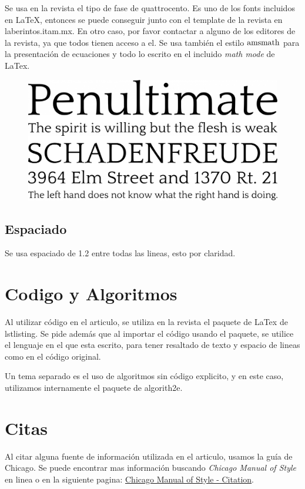 \documentclass{article}
\begin{document}
Se usa en la revista el tipo de fase de quattrocento. Es uno de los fonts incluidos en LaTeX, entonces se puede conseguir junto con el template de la revista en laberintos.itam.mx. En otro caso, por favor contactar a alguno de los editores de la revista, ya que todos tienen acceso a el. Se usa también el estilo $\textnormal{amsmath}$ para la presentación de ecuaciones y todo lo escrito en el incluido \textit{math mode} de LaTex. 

\begin{figure}[ht]
\includegraphics[width=12cm]{font.png}
\centering
\end{figure}

\subsection{Espaciado}
Se usa espaciado de 1.2 entre todas las lineas, esto por claridad. 

\section{Codigo y Algoritmos} 
Al utilizar código en el articulo, se utiliza en la revista el paquete de LaTex de lstlisting. Se pide además que al importar el código usando el paquete, se utilice el lenguaje en el que esta escrito, para tener resaltado de texto y espacio de lineas como en el código original. 

Un tema separado es el uso de algoritmos sin código explicito, y en este caso, utilizamos internamente el paquete de algorith2e.

\section{Citas}
Al citar alguna fuente de información utilizada en el articulo, usamos la guía de Chicago. Se puede encontrar mas información buscando \textit{Chicago Manual of Style} en linea o en la siguiente pagina: \href{http://www.chicagomanualofstyle.org/tools_citationguide/citation-guide-1.html}{\underline{Chicago Manual of Style - Citation}}.
\end{document}
